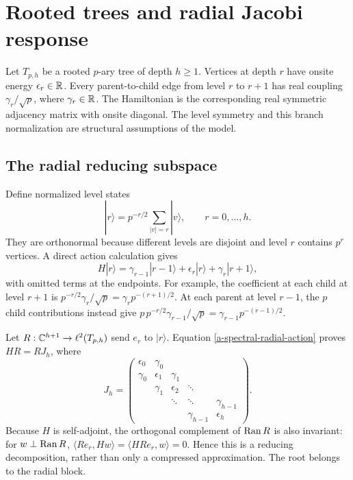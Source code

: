 \section{Rooted trees and radial Jacobi response}
\label{a-spectral-radial}

Let $T_{p,h}$ be a rooted $p$-ary tree of depth $h\geq1$. Vertices at
depth $r$ have onsite energy $\epsilon_r\in\mathbb R$. Every parent-to-child
edge from level $r$ to $r+1$ has real coupling $\gamma_r/\sqrt p$,
where $\gamma_r\in\mathbb R$. The Hamiltonian is the corresponding real
symmetric adjacency matrix with onsite diagonal. The level symmetry
and this branch normalization are structural assumptions of the model.

\subsection{The radial reducing subspace}

Define normalized level states
\[
 |r\rangle=p^{-r/2}\sum_{|v|=r}|v\rangle,
 \qquad r=0,\ldots,h.
\]
They are orthonormal because different levels are disjoint and level
$r$ contains $p^r$ vertices. A direct action calculation gives
\begin{equation}
 H|r\rangle=\gamma_{r-1}|r-1\rangle
              +\epsilon_r|r\rangle+\gamma_r|r+1\rangle,
 \label{a-spectral-radial-action}
\end{equation}
with omitted terms at the endpoints. For example, the coefficient at
each child at level $r+1$ is
$p^{-r/2}\gamma_r/\sqrt p=\gamma_r p^{-(r+1)/2}$.
At each parent at level $r-1$, the $p$ child contributions instead give
$p\,p^{-r/2}\gamma_{r-1}/\sqrt p
=\gamma_{r-1}p^{-(r-1)/2}$.

Let $R:\mathbb C^{h+1}\to\ell^2(T_{p,h})$ send $e_r$ to $|r\rangle$.
Equation \eqref{a-spectral-radial-action} proves $HR=RJ_h$, where
\begin{equation}
 J_h=\begin{pmatrix}
 \epsilon_0&\gamma_0&&&\\
 \gamma_0&\epsilon_1&\gamma_1&&\\
 &\gamma_1&\epsilon_2&\ddots&\\
 &&\ddots&\ddots&\gamma_{h-1}\\
 &&&\gamma_{h-1}&\epsilon_h
 \end{pmatrix}.
 \label{a-spectral-jacobi-matrix}
\end{equation}
Because $H$ is self-adjoint, the orthogonal complement of $\operatorname{Ran} R$ is
also invariant: for $w\perp\operatorname{Ran} R$,
$\langle Re_r,Hw\rangle=\langle HRe_r,w\rangle=0$.
Hence this is a reducing decomposition, rather than only a compressed
approximation. The root belongs to the radial block.

